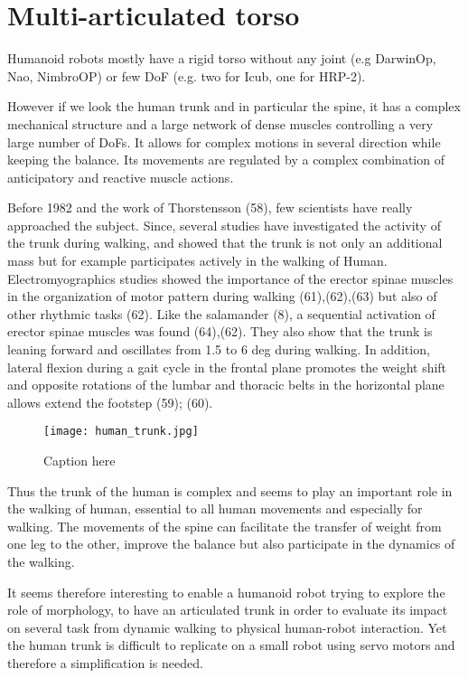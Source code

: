 \section{Multi-articulated torso} %

Humanoid robots mostly have a rigid torso without any joint (e.g DarwinOp, Nao, NimbroOP) or few DoF (e.g. two for Icub, one for HRP-2).

However if we look the human trunk and in particular the spine, it has a complex mechanical structure and a large network of dense muscles controlling a very large number of DoFs. It allows for complex motions in several direction while keeping the balance. Its movements are regulated by a complex combination of anticipatory and reactive muscle actions.

Before 1982 and the work of Thorstensson (58), few scientists have really approached the subject. Since, several studies have investigated the activity of the trunk during walking, and showed that the trunk is not only an additional mass but for example participates actively in the walking of Human.
Electromyographics studies showed the importance of the erector spinae muscles in the organization of motor pattern during walking (61),(62),(63) but also of other rhythmic tasks (62). Like the salamander (8), a sequential activation of erector spinae muscles was found (64),(62).
They also show that the trunk is leaning forward and oscillates from 1.5 to 6 deg during walking. In addition, lateral flexion during a gait cycle in the frontal plane promotes the weight shift and opposite rotations of the lumbar and thoracic belts in the horizontal plane allows extend the footstep (59); (60).

\begin{figure}[h]
    \begin{center}
        \texttt{[image: human\_trunk.jpg]}
    \end{center}
    \caption{Caption here}
    \label{fig:human_spine_system}
\end{figure}

Thus the trunk of the human is complex and seems to play an important role in the walking of human, essential to all human movements and especially for walking. The movements of the spine can facilitate the transfer of weight from one leg to the other, improve the balance but also participate in the dynamics of the walking.

It seems therefore interesting to enable a humanoid robot trying to explore the role of morphology, to have an articulated trunk in order to evaluate its impact on several task from dynamic walking to physical human-robot interaction. Yet the human trunk is difficult to replicate on a small robot using servo motors and therefore a simplification is needed.



